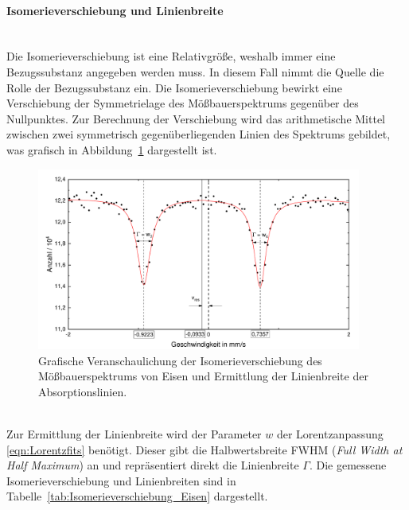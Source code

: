 \documentclass[a4paper,twoside,final]{article}
\begin{document}
\paragraph{Isomerieverschiebung und Linienbreite}$~$\\
Die Isomerieverschiebung ist eine Relativgröße, weshalb immer eine Bezugssubstanz angegeben werden muss. In diesem Fall nimmt die Quelle die Rolle der Bezugssubstanz ein. Die Isomerieverschiebung bewirkt eine Verschiebung der Symmetrielage des Mößbauerspektrums gegenüber des Nullpunktes. Zur Berechnung der Verschiebung wird das arithmetische Mittel zwischen zwei symmetrisch gegenüberliegenden Linien des Spektrums gebildet, was grafisch in Abbildung~\ref{fig:Eisen_Isomerieverschiebung} dargestellt ist.
\begin{figure}[htp]
    \centering
    \vspace{-0.3cm}
    \includegraphics[width=0.95\textwidth]{Bilder/Eisen_Isomerieverschiebung.pdf}
    \caption{Grafische Veranschaulichung der Isomerieverschiebung des Mößbauerspektrums von Eisen und Ermittlung der Linienbreite der Absorptionslinien.}
    \label{fig:Eisen_Isomerieverschiebung}
\end{figure}\\
Zur Ermittlung der Linienbreite wird der Parameter $w$ der Lorentzanpassung \eqref{eqn:Lorentzfits} benötigt. Dieser gibt die Halbwertsbreite FWHM (\textit{Full Width at Half Maximum}) an und repräsentiert direkt die Linienbreite $\Gamma$. Die gemessene Isomerieverschiebung und Linienbreiten sind in Tabelle~\ref{tab:Isomerieverschiebung_Eisen} dargestellt.
\end{document}
